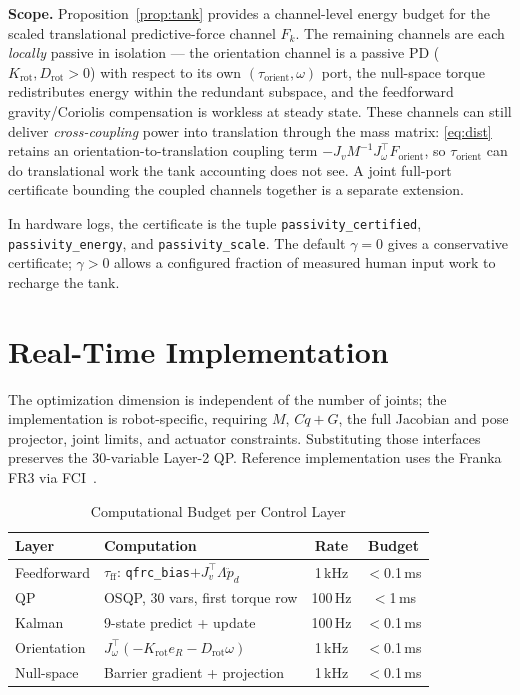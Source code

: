 \documentclass[journal]{IEEEtran}
\begin{document}
\textbf{Scope.} Proposition~\ref{prop:tank} provides a channel-level
energy budget for the scaled translational predictive-force channel
$F_k$. The remaining channels are each \emph{locally} passive in
isolation --- the orientation channel is a passive PD
($K_{\text{rot}},D_{\text{rot}}>0$) with respect to its own
$(\tau_{\text{orient}},\omega)$ port, the null-space torque
redistributes energy within the redundant subspace, and the feedforward
gravity/Coriolis compensation is workless at steady state. These channels
can still deliver \emph{cross-coupling} power into translation through the
mass matrix: \eqref{eq:dist} retains an orientation-to-translation
coupling term $-J_vM^{-1}J_\omega^\top F_{\text{orient}}$, so
$\tau_{\text{orient}}$ can do translational work the tank accounting does
not see. A joint full-port certificate bounding the coupled channels
together is a separate extension.

In hardware logs, the certificate is the tuple
\texttt{passivity\_certified}, \texttt{passivity\_energy}, and
\texttt{passivity\_scale}. The default $\gamma=0$ gives a conservative
certificate; $\gamma>0$ allows a configured fraction of measured human input
work to recharge the tank.

\section{Real-Time Implementation}

The optimization dimension is independent of the number of joints; the
implementation is robot-specific, requiring $M$, $C\dot q+G$, the
full Jacobian and pose projector, joint limits, and actuator constraints.
Substituting those interfaces preserves the 30-variable Layer-2 QP.
Reference implementation uses the Franka FR3 via
FCI~\cite{franka2023fr3}.

\begin{table}[!t]
\caption{Computational Budget per Control Layer}
\label{tab:compute}
\renewcommand{\arraystretch}{1.0}
\centering
\setlength{\tabcolsep}{4pt}
\footnotesize
\begin{tabular}{@{}llcc@{}}
\toprule
\textbf{Layer} & \textbf{Computation} & \textbf{Rate} & \textbf{Budget}\\
\midrule
Feedforward & $\tau_{\text{ff}}$: \texttt{qfrc\_bias}$+J_v^\top\Lambda\ddot{p}_d$ & 1\,kHz & $<$0.1\,ms\\
QP          & OSQP, 30 vars, first torque row       & 100\,Hz  & $<$1\,ms\\
Kalman      & 9-state predict + update              & 100\,Hz  & $<$0.1\,ms\\
Orientation & $J_\omega^\top(-K_{\text{rot}}e_R-D_{\text{rot}}\omega)$ & 1\,kHz & $<$0.1\,ms\\
Null-space  & Barrier gradient + projection         & 1\,kHz   & $<$0.1\,ms\\
\bottomrule
\end{tabular}
\end{table}
\end{document}
